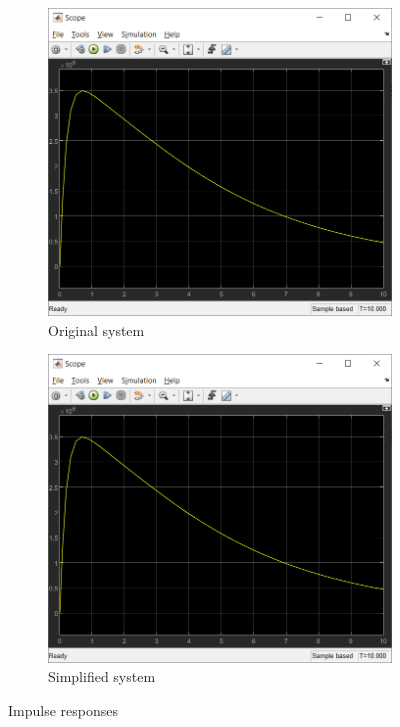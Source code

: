 \documentclass{article}
\begin{document}
\begin{figure}[H]
   	 \centering
     \begin{subfigure}[b]{0.45\textwidth}
         \centering
         \includegraphics[width=\textwidth]{sources/image2_6.png}
         \caption{Original system}
         \label{fig:fig4}
     \end{subfigure}
     \hfill
     \begin{subfigure}[b]{0.45\textwidth}
         \centering
         \includegraphics[width=\textwidth]{sources/image2_7.png}
         \caption{Simplified system}
         \label{fig:fig5}
     \end{subfigure}
     \caption{Impulse responses}
\end{figure}
\end{document}
